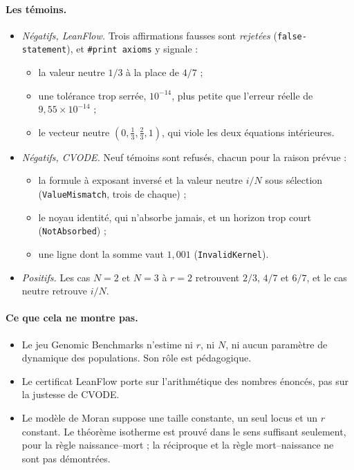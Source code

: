 \paragraph{Les témoins.}
\begin{itemize}
\item \emph{Négatifs, LeanFlow.} Trois affirmations fausses sont \emph{rejetées} (\texttt{false-statement}), et
\texttt{\#print axioms} y signale  :
\begin{itemize}
\item la valeur neutre $1/3$ à la place de $4/7$ ;
\item une tolérance trop serrée, $10^{-14}$, plus petite que l'erreur réelle de $9{,}55\times10^{-14}$ ;
\item le vecteur neutre $(0,\tfrac13,\tfrac23,1)$, qui viole les deux équations intérieures.
\end{itemize}
\item \emph{Négatifs, CVODE.} Neuf témoins sont refusés, chacun pour la raison prévue :
\begin{itemize}
\item la formule à exposant inversé et la valeur neutre $i/N$ sous sélection (\texttt{ValueMismatch}, trois de
chaque) ;
\item le noyau identité, qui n'absorbe jamais, et un horizon trop court (\texttt{NotAbsorbed}) ;
\item une ligne dont la somme vaut $1{,}001$ (\texttt{InvalidKernel}).
\end{itemize}
\item \emph{Positifs.} Les cas $N=2$ et $N=3$ à $r=2$ retrouvent $2/3$, $4/7$ et $6/7$, et le cas neutre retrouve $i/N$.
\end{itemize}

\paragraph{Ce que cela ne montre pas.}
\begin{itemize}
\item Le jeu Genomic Benchmarks n'estime ni $r$, ni $N$, ni aucun paramètre de dynamique des populations. Son rôle
est pédagogique.
\item Le certificat LeanFlow porte sur l'arithmétique des nombres énoncés, pas sur la justesse de CVODE.
\item Le modèle de Moran suppose une taille constante, un seul locus et un $r$ constant. Le théorème isotherme est
prouvé dans le sens \og suffisant \fg{} seulement, pour la règle naissance--mort ; la réciproque et la règle
mort--naissance ne sont pas démontrées.
\end{itemize}


